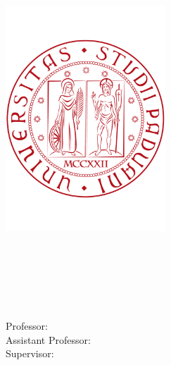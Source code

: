 \begin{titlepage}
    \begin{addmargin}[-1cm]{-3cm}
    \begin{center}
        \large

        \hfill

        \vfill

        \begingroup
            \color{CTtitle}\spacedallcaps{\myTitle} \\ \bigskip
        \endgroup

        \spacedlowsmallcaps{\myName}

        \vfill

        \includegraphics[width=6cm]{gfx/logounipd-c} \\ \medskip

        \myDepartment \\
        \myFaculty \\
        \myUni \\ \bigskip

        \myTime\ %

        \vfill

    \end{center}
    \noindent Professor: \myProf \\
    Assistant Professor: \myOtherProf \\
    Supervisor: \mySupervisor
  \end{addmargin}
\end{titlepage}

